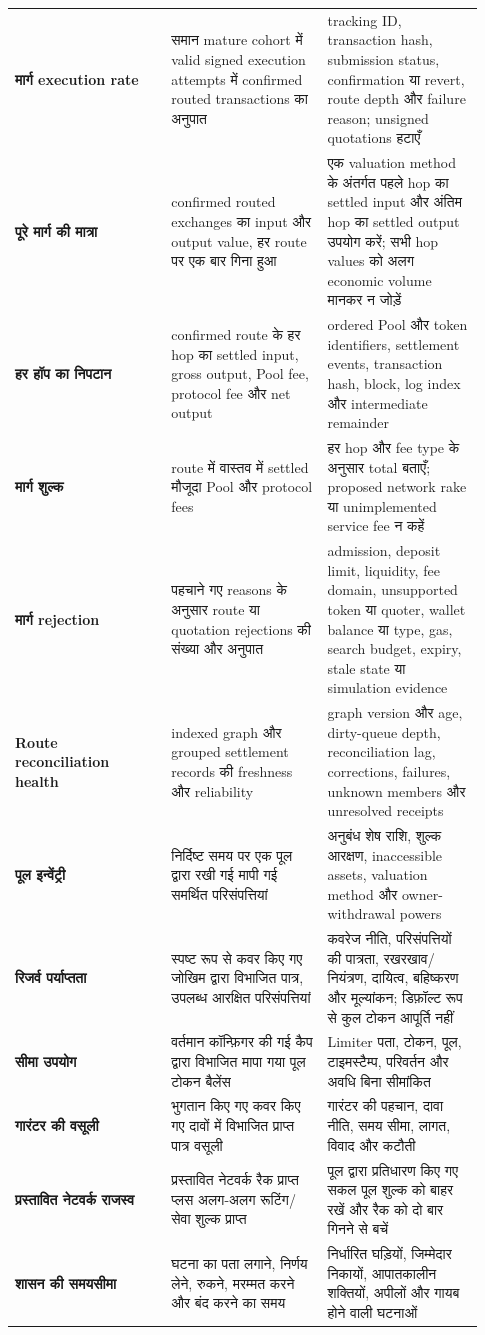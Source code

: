 \documentclass[11pt]{article}
\begin{document}
\begin{longtable}{P{0.31\linewidth} P{0.31\linewidth} P{0.31\linewidth}}
\textbf{मार्ग execution rate} & समान mature cohort में valid signed execution attempts में confirmed routed transactions का अनुपात & tracking ID, transaction hash, submission status, confirmation या revert, route depth और failure reason; unsigned quotations हटाएँ \\
\textbf{पूरे मार्ग की मात्रा} & confirmed routed exchanges का input और output value, हर route पर एक बार गिना हुआ & एक valuation method के अंतर्गत पहले hop का settled input और अंतिम hop का settled output उपयोग करें; सभी hop values को अलग economic volume मानकर न जोड़ें \\
\textbf{हर हॉप का निपटान} & confirmed route के हर hop का settled input, gross output, Pool fee, protocol fee और net output & ordered Pool और token identifiers, settlement events, transaction hash, block, log index और intermediate remainder \\
\textbf{मार्ग शुल्क} & route में वास्तव में settled मौजूदा Pool और protocol fees & हर hop और fee type के अनुसार total बताएँ; proposed network rake या unimplemented service fee न कहें \\
\textbf{मार्ग rejection} & पहचाने गए reasons के अनुसार route या quotation rejections की संख्या और अनुपात & admission, deposit limit, liquidity, fee domain, unsupported token या quoter, wallet balance या type, gas, search budget, expiry, stale state या simulation evidence \\
\textbf{Route reconciliation health} & indexed graph और grouped settlement records की freshness और reliability & graph version और age, dirty-queue depth, reconciliation lag, corrections, failures, unknown members और unresolved receipts \\
\textbf{पूल इन्वेंट्री} & निर्दिष्ट समय पर एक पूल द्वारा रखी गई मापी गई समर्थित परिसंपत्तियां & अनुबंध शेष राशि, शुल्क आरक्षण, inaccessible assets, valuation method और owner-withdrawal powers \\
\textbf{रिजर्व पर्याप्तता} & स्पष्ट रूप से कवर किए गए जोखिम द्वारा विभाजित पात्र, उपलब्ध आरक्षित परिसंपत्तियां & कवरेज नीति, परिसंपत्तियों की पात्रता, रखरखाव/नियंत्रण, दायित्व, बहिष्करण और मूल्यांकन; डिफ़ॉल्ट रूप से कुल टोकन आपूर्ति नहीं \\
\textbf{सीमा उपयोग} & वर्तमान कॉन्फ़िगर की गई कैप द्वारा विभाजित मापा गया पूल टोकन बैलेंस & Limiter पता, टोकन, पूल, टाइमस्टैम्प, परिवर्तन और अवधि बिना सीमांकित \\
\textbf{गारंटर की वसूली} & भुगतान किए गए कवर किए गए दावों में विभाजित प्राप्त पात्र वसूली & गारंटर की पहचान, दावा नीति, समय सीमा, लागत, विवाद और कटौती \\
\textbf{प्रस्तावित नेटवर्क राजस्व} & प्रस्तावित नेटवर्क रैक प्राप्त प्लस अलग-अलग रूटिंग/सेवा शुल्क प्राप्त & पूल द्वारा प्रतिधारण किए गए सकल पूल शुल्क को बाहर रखें और रैक को दो बार गिनने से बचें \\
\textbf{शासन की समयसीमा} & घटना का पता लगाने, निर्णय लेने, रुकने, मरम्मत करने और बंद करने का समय & निर्धारित घड़ियों, जिम्मेदार निकायों, आपातकालीन शक्तियों, अपीलों और गायब होने वाली घटनाओं \\
\bottomrule
\end{longtable}
\end{document}
